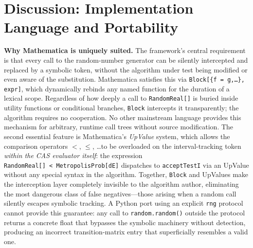 \documentclass[twocolumn,10pt]{article}
\begin{document}
\section{Discussion: Implementation Language and Portability}
\label{sec:discussion}

\medskip\noindent\textbf{Why Mathematica is uniquely suited.}
The framework's central requirement is that every call to the random-number
generator can be silently intercepted and replaced by a symbolic token,
without the algorithm under test being modified or even aware of the
substitution.  Mathematica satisfies this via \texttt{Block[\{f\,=\,g,\ldots\},\,expr]},
which dynamically rebinds any named function for the duration of a
lexical scope.  Regardless of how deeply a call to
\texttt{RandomReal[]} is buried inside utility functions or conditional
branches, \texttt{Block} intercepts it transparently; the algorithm
requires no cooperation.  No other mainstream language provides this
mechanism for arbitrary, runtime call trees without source modification.
The second essential feature is Mathematica's \emph{UpValue} system,
which allows the comparison operators $<$, $\leq$, \ldots to be
overloaded on the interval-tracking token \emph{within the CAS evaluator
itself}: the expression \texttt{RandomReal[]~<~MetropolisProb[dE]} dispatches to
\texttt{acceptTestI} via an UpValue without any special syntax in the algorithm.
Together, \texttt{Block} and UpValues make the interception layer
completely invisible to the algorithm author, eliminating the most
dangerous class of false negatives---those arising when a random call
silently escapes symbolic tracking.  A Python port using an explicit
\texttt{rng} protocol cannot provide this guarantee: any call to
\texttt{random.random()} outside the protocol returns a concrete float
that bypasses the symbolic machinery without detection, producing an
incorrect transition-matrix entry that superficially resembles a valid one.
\end{document}
